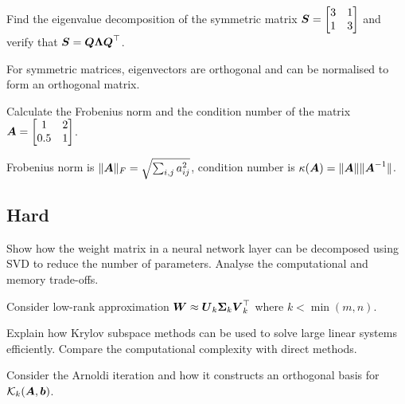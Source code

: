 \begin{exercisebox}[medium]
\begin{problem}
Find the eigenvalue decomposition of the symmetric matrix $\boldsymbol{S} = \begin{bmatrix} 3 & 1 \\ 1 & 3 \end{bmatrix}$ and verify that $\boldsymbol{S} = \boldsymbol{Q}\boldsymbol{\Lambda}\boldsymbol{Q}^\top$.
\end{problem}
\begin{hintbox}
For symmetric matrices, eigenvectors are orthogonal and can be normalised to form an orthogonal matrix.
\end{hintbox}
\end{exercisebox}


\begin{exercisebox}[medium]
\begin{problem}
Calculate the Frobenius norm and the condition number of the matrix $\boldsymbol{A} = \begin{bmatrix} 1 & 2 \\ 0.5 & 1 \end{bmatrix}$.
\end{problem}
\begin{hintbox}
Frobenius norm is $\|\boldsymbol{A}\|_F = \sqrt{\sum_{i,j} a_{ij}^2}$, condition number is $\kappa(\boldsymbol{A}) = \|\boldsymbol{A}\|\|\boldsymbol{A}^{-1}\|$.
\end{hintbox}
\end{exercisebox}


\subsection*{Hard}

\begin{exercisebox}[hard]
\begin{problem}
Show how the weight matrix in a neural network layer can be decomposed using SVD to reduce the number of parameters. Analyse the computational and memory trade-offs.
\end{problem}
\begin{hintbox}
Consider low-rank approximation $\boldsymbol{W} \approx \boldsymbol{U}_k \boldsymbol{\Sigma}_k \boldsymbol{V}_k^\top$ where $k < \min(m,n)$.
\end{hintbox}
\end{exercisebox}


\begin{exercisebox}[hard]
\begin{problem}
Explain how Krylov subspace methods can be used to solve large linear systems efficiently. Compare the computational complexity with direct methods.
\end{problem}
\begin{hintbox}
Consider the Arnoldi iteration and how it constructs an orthogonal basis for $\mathcal{K}_k(\boldsymbol{A}, \boldsymbol{b})$.
\end{hintbox}
\end{exercisebox}


